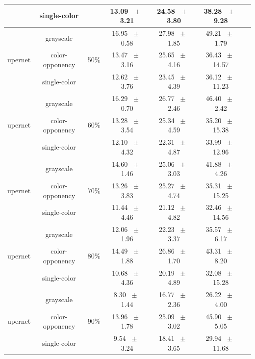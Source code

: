 \begin{table}[h]
\begin{tabular}{@{}lccc ccc@{}}
    & single-color &  & 13.09 ~$\pm$~ 3.21 & 24.58 ~$\pm$~ 3.80 & 38.28 ~$\pm$~ 9.28 \\
    \midrule
    \multirow{3}{*}{upernet} & grayscale & \multirow{3}{*}{50\%} & 16.95 ~$\pm$~ 0.58 & 27.98 ~$\pm$~ 1.85 & 49.21 ~$\pm$~ 1.79 \\
    & color-opponency &  & 13.47 ~$\pm$~ 3.16 & 25.65 ~$\pm$~ 4.16 & 36.43 ~$\pm$~ 14.57 \\
    & single-color &  & 12.62 ~$\pm$~ 3.76 & 23.45 ~$\pm$~ 4.39 & 36.12 ~$\pm$~ 11.23 \\
    \midrule
    \multirow{3}{*}{upernet} & grayscale & \multirow{3}{*}{60\%} & 16.29 ~$\pm$~ 0.70 & 26.77 ~$\pm$~ 2.46 & 46.40 ~$\pm$~ 2.42 \\
    & color-opponency &  & 13.28 ~$\pm$~ 3.54 & 25.34 ~$\pm$~ 4.59 & 35.20 ~$\pm$~ 15.38 \\
    & single-color &  & 12.10 ~$\pm$~ 4.32 & 22.31 ~$\pm$~ 4.87 & 33.99 ~$\pm$~ 12.96 \\
    \midrule
    \multirow{3}{*}{upernet} & grayscale & \multirow{3}{*}{70\%} & 14.60 ~$\pm$~ 1.46 & 25.06 ~$\pm$~ 3.03 & 41.88 ~$\pm$~ 4.26 \\
    & color-opponency &  & 13.26 ~$\pm$~ 3.83 & 25.27 ~$\pm$~ 4.74 & 35.31 ~$\pm$~ 15.25 \\
    & single-color &  & 11.44 ~$\pm$~ 4.46 & 21.12 ~$\pm$~ 4.82 & 32.46 ~$\pm$~ 14.56 \\
    \midrule
    \multirow{3}{*}{upernet} & grayscale & \multirow{3}{*}{80\%} & 12.06 ~$\pm$~ 1.96 & 22.23 ~$\pm$~ 3.37 & 35.57 ~$\pm$~ 6.17 \\
    & color-opponency &  & 14.49 ~$\pm$~ 1.88 & 26.86 ~$\pm$~ 1.70 & 43.31 ~$\pm$~ 8.20 \\
    & single-color &  & 10.68 ~$\pm$~ 4.36 & 20.19 ~$\pm$~ 4.89 & 32.08 ~$\pm$~ 15.28 \\
    \midrule
    \multirow{3}{*}{upernet} & grayscale & \multirow{3}{*}{90\%} & 8.30 ~$\pm$~ 1.44 & 16.77 ~$\pm$~ 2.36 & 26.22 ~$\pm$~ 4.00 \\
    & color-opponency &  & 13.96 ~$\pm$~ 1.78 & 25.09 ~$\pm$~ 3.02 & 45.90 ~$\pm$~ 5.05 \\
    & single-color &  & 9.54 ~$\pm$~ 3.24 & 18.41 ~$\pm$~ 3.65 & 29.94 ~$\pm$~ 11.68 \\
    \midrule
    \bottomrule
  \end{tabular}
  \label{tab:sparse_results_upernet_dark_zurich}
\end{table}